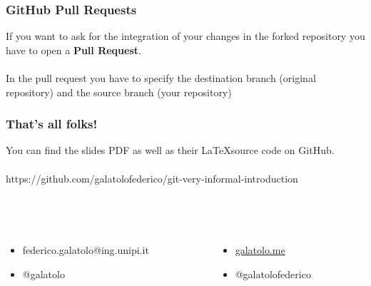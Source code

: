 \documentclass{beamer}
\begin{document}
\begin{frame}
    \frametitle{GitHub Pull Requests}
    If you want to ask for the integration of your changes in the forked repository you have to open a \textbf{Pull Request}.\\
    \hfill \\
    In the pull request you have to specify the destination branch (original repository) and the source branch (your repository)  
\end{frame}


\begin{frame}
    \frametitle{That's all folks!}
    \begin{center}
        You can find the slides PDF as well as their \LaTeX \;source code on GitHub. \\
        \hfill \\
        https://github.com/galatolofederico/git-very-informal-introduction
    \end{center}
    \hfill \\
    \hfill \\
    \begin{columns}
        \begin{column}{.5\textwidth}
            \begin{itemize}
                \item [\faEnvelope] federico.galatolo@ing.unipi.it
                \item [\faPaperPlane] @galatolo
            \end{itemize}
        \end{column}
        \begin{column}{.5\textwidth}
            \begin{itemize}
				\item [\faGlobe] \href{https://galatolo.me}{galatolo.me}
                \item [\faGithub] @galatolofederico
            \end{itemize}
        \end{column}
    \end{columns}
\end{frame}
\end{document}
